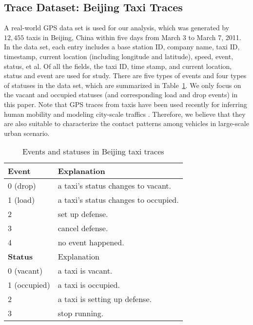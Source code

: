 \subsection{Trace Dataset: Beijing Taxi Traces}
\label{section_trace_data}

A real-world GPS data set is used for our analysis, which was generated by $12,455$ taxis in Beijing, China within five days from March 3 to March 7, 2011. In the data set, each entry includes a base station ID, company name, taxi ID, timestamp, current location (including longitude and latitude), speed, event, status, et al. Of all the fields, the taxi ID, time stamp, and current location, status and event are used for study. There are five types of events and four types of statuses in the data set, which are summarized in Table~\ref{table_event_detail}. We only focus on the vacant and occupied statuses (and corresponding 
load and drop events) in this paper. Note that GPS traces from taxis have been used recently for inferring human mobility \cite{Ganti} and modeling city-scale traffics \cite{Aslam}. Therefore, we believe that they are also suitable to characterize the contact patterns among vehicles in large-scale urban scenario.

\begin{table}[!h]
\caption{Events and statuses in Beijing taxi traces}\label{table_event_detail}
\centering
\begin{tabular}{l|l}
  \hline
  {\bf Event} & Explanation \\
  \hline
  0 (drop) & a taxi's status changes to vacant.\\
  \hline
  1 (load) & a taxi's status changes to occupied.\\
  \hline
  2 & set up defense.\\
  \hline
  3 & cancel defense.\\
  \hline
  4 & no event happened.\\
  \hline
  \hline
  {\bf Status} & Explanation \\
  \hline
0 (vacant) & a taxi is vacant. \\
    \hline
1 (occupied) & a taxi is occupied. \\
    \hline
2 & a taxi is setting up defense. \\
    \hline
3 & stop running.\\
  \hline
\end{tabular}
\end{table}






